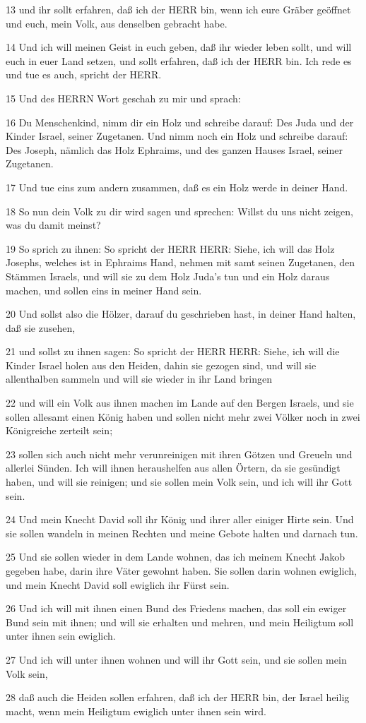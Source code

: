 \par 13 und ihr sollt erfahren, daß ich der HERR bin, wenn ich eure Gräber geöffnet und euch, mein Volk, aus denselben gebracht habe.
\par 14 Und ich will meinen Geist in euch geben, daß ihr wieder leben sollt, und will euch in euer Land setzen, und sollt erfahren, daß ich der HERR bin. Ich rede es und tue es auch, spricht der HERR.
\par 15 Und des HERRN Wort geschah zu mir und sprach:
\par 16 Du Menschenkind, nimm dir ein Holz und schreibe darauf: Des Juda und der Kinder Israel, seiner Zugetanen. Und nimm noch ein Holz und schreibe darauf: Des Joseph, nämlich das Holz Ephraims, und des ganzen Hauses Israel, seiner Zugetanen.
\par 17 Und tue eins zum andern zusammen, daß es ein Holz werde in deiner Hand.
\par 18 So nun dein Volk zu dir wird sagen und sprechen: Willst du uns nicht zeigen, was du damit meinst?
\par 19 So sprich zu ihnen: So spricht der HERR HERR: Siehe, ich will das Holz Josephs, welches ist in Ephraims Hand, nehmen mit samt seinen Zugetanen, den Stämmen Israels, und will sie zu dem Holz Juda's tun und ein Holz daraus machen, und sollen eins in meiner Hand sein.
\par 20 Und sollst also die Hölzer, darauf du geschrieben hast, in deiner Hand halten, daß sie zusehen,
\par 21 und sollst zu ihnen sagen: So spricht der HERR HERR: Siehe, ich will die Kinder Israel holen aus den Heiden, dahin sie gezogen sind, und will sie allenthalben sammeln und will sie wieder in ihr Land bringen
\par 22 und will ein Volk aus ihnen machen im Lande auf den Bergen Israels, und sie sollen allesamt einen König haben und sollen nicht mehr zwei Völker noch in zwei Königreiche zerteilt sein;
\par 23 sollen sich auch nicht mehr verunreinigen mit ihren Götzen und Greueln und allerlei Sünden. Ich will ihnen heraushelfen aus allen Örtern, da sie gesündigt haben, und will sie reinigen; und sie sollen mein Volk sein, und ich will ihr Gott sein.
\par 24 Und mein Knecht David soll ihr König und ihrer aller einiger Hirte sein. Und sie sollen wandeln in meinen Rechten und meine Gebote halten und darnach tun.
\par 25 Und sie sollen wieder in dem Lande wohnen, das ich meinem Knecht Jakob gegeben habe, darin ihre Väter gewohnt haben. Sie sollen darin wohnen ewiglich, und mein Knecht David soll ewiglich ihr Fürst sein.
\par 26 Und ich will mit ihnen einen Bund des Friedens machen, das soll ein ewiger Bund sein mit ihnen; und will sie erhalten und mehren, und mein Heiligtum soll unter ihnen sein ewiglich.
\par 27 Und ich will unter ihnen wohnen und will ihr Gott sein, und sie sollen mein Volk sein,
\par 28 daß auch die Heiden sollen erfahren, daß ich der HERR bin, der Israel heilig macht, wenn mein Heiligtum ewiglich unter ihnen sein wird.

